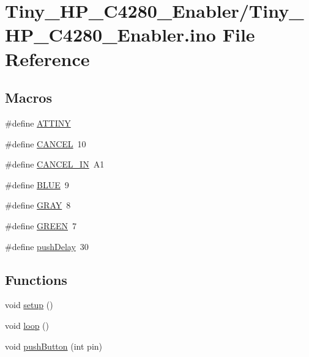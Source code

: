 \hypertarget{Tiny__HP__C4280__Enabler_8ino}{\section{Tiny\-\_\-\-H\-P\-\_\-\-C4280\-\_\-\-Enabler/\-Tiny\-\_\-\-H\-P\-\_\-\-C4280\-\_\-\-Enabler.ino File Reference}
\label{Tiny__HP__C4280__Enabler_8ino}
}
\subsection*{Macros}
\begin{DoxyCompactItemize}
\item 
\#define \hyperlink{Tiny__HP__C4280__Enabler_8ino_a9ccf4cb5020d6bf39b5d9f879d16416e}{A\-T\-T\-I\-N\-Y}
\item 
\#define \hyperlink{Tiny__HP__C4280__Enabler_8ino_aa498dfb3e15bd0b6ad9ef32a24990e8c}{C\-A\-N\-C\-E\-L}~10
\item 
\#define \hyperlink{Tiny__HP__C4280__Enabler_8ino_a46208ca07f468f0e32f39525ab0a68de}{C\-A\-N\-C\-E\-L\-\_\-\-I\-N}~A1
\item 
\#define \hyperlink{Tiny__HP__C4280__Enabler_8ino_a79d10e672abb49ad63eeaa8aaef57c38}{B\-L\-U\-E}~9
\item 
\#define \hyperlink{Tiny__HP__C4280__Enabler_8ino_ae5f70677050eecd8909e0248e07b9e73}{G\-R\-A\-Y}~8
\item 
\#define \hyperlink{Tiny__HP__C4280__Enabler_8ino_acfbc006ea433ad708fdee3e82996e721}{G\-R\-E\-E\-N}~7
\item 
\#define \hyperlink{Tiny__HP__C4280__Enabler_8ino_a33929d2ebfcef52fb30ca4bfcf6d0020}{push\-Delay}~30
\end{DoxyCompactItemize}
\subsection*{Functions}
\begin{DoxyCompactItemize}
\item 
void \hyperlink{Tiny__HP__C4280__Enabler_8ino_a4fc01d736fe50cf5b977f755b675f11d}{setup} ()
\item 
void \hyperlink{Tiny__HP__C4280__Enabler_8ino_afe461d27b9c48d5921c00d521181f12f}{loop} ()
\item 
void \hyperlink{Tiny__HP__C4280__Enabler_8ino_aeaa0a507deaea827ad5818baa7bf6ac9}{push\-Button} (int pin)
\end{DoxyCompactItemize}
